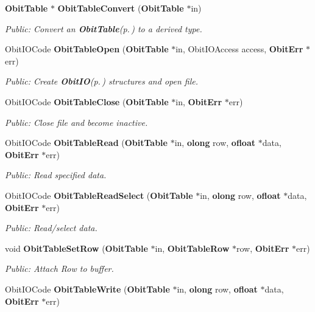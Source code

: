 \begin{CompactItemize}
{\bf Obit\-Table} $\ast$ {\bf Obit\-Table\-Convert} ({\bf Obit\-Table} $\ast$in)
\begin{CompactList}\small\item\em Public: Convert an {\bf Obit\-Table}{\rm (p.\,\pageref{structObitTable})} to a derived type. \item\end{CompactList}\item 
Obit\-IOCode {\bf Obit\-Table\-Open} ({\bf Obit\-Table} $\ast$in, Obit\-IOAccess access, {\bf Obit\-Err} $\ast$err)
\begin{CompactList}\small\item\em Public: Create {\bf Obit\-IO}{\rm (p.\,\pageref{structObitIO})} structures and open file. \item\end{CompactList}\item 
Obit\-IOCode {\bf Obit\-Table\-Close} ({\bf Obit\-Table} $\ast$in, {\bf Obit\-Err} $\ast$err)
\begin{CompactList}\small\item\em Public: Close file and become inactive. \item\end{CompactList}\item 
Obit\-IOCode {\bf Obit\-Table\-Read} ({\bf Obit\-Table} $\ast$in, {\bf olong} row, {\bf ofloat} $\ast$data, {\bf Obit\-Err} $\ast$err)
\begin{CompactList}\small\item\em Public: Read specified data. \item\end{CompactList}\item 
Obit\-IOCode {\bf Obit\-Table\-Read\-Select} ({\bf Obit\-Table} $\ast$in, {\bf olong} row, {\bf ofloat} $\ast$data, {\bf Obit\-Err} $\ast$err)
\begin{CompactList}\small\item\em Public: Read/select data. \item\end{CompactList}\item 
void {\bf Obit\-Table\-Set\-Row} ({\bf Obit\-Table} $\ast$in, {\bf Obit\-Table\-Row} $\ast$row, {\bf Obit\-Err} $\ast$err)
\begin{CompactList}\small\item\em Public: Attach Row to buffer. \item\end{CompactList}\item 
Obit\-IOCode {\bf Obit\-Table\-Write} ({\bf Obit\-Table} $\ast$in, {\bf olong} row, {\bf ofloat} $\ast$data, {\bf Obit\-Err} $\ast$err)

\end{CompactItemize}
